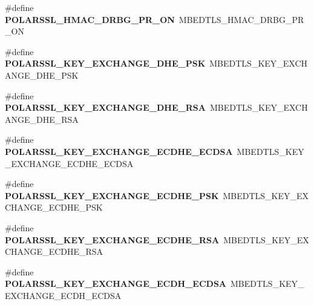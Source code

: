 \begin{DoxyCompactItemize}
\#define {\bfseries P\+O\+L\+A\+R\+S\+S\+L\+\_\+\+H\+M\+A\+C\+\_\+\+D\+R\+B\+G\+\_\+\+P\+R\+\_\+\+ON}~M\+B\+E\+D\+T\+L\+S\+\_\+\+H\+M\+A\+C\+\_\+\+D\+R\+B\+G\+\_\+\+P\+R\+\_\+\+ON
\item 
\mbox{\label{compat-1_83_8h_ae0a092dafdfbe4797aa47c996d6568c8}} 
\#define {\bfseries P\+O\+L\+A\+R\+S\+S\+L\+\_\+\+K\+E\+Y\+\_\+\+E\+X\+C\+H\+A\+N\+G\+E\+\_\+\+D\+H\+E\+\_\+\+P\+SK}~M\+B\+E\+D\+T\+L\+S\+\_\+\+K\+E\+Y\+\_\+\+E\+X\+C\+H\+A\+N\+G\+E\+\_\+\+D\+H\+E\+\_\+\+P\+SK
\item 
\mbox{\label{compat-1_83_8h_a7fded867682fdc0a81c3da4ddcb1bcfd}} 
\#define {\bfseries P\+O\+L\+A\+R\+S\+S\+L\+\_\+\+K\+E\+Y\+\_\+\+E\+X\+C\+H\+A\+N\+G\+E\+\_\+\+D\+H\+E\+\_\+\+R\+SA}~M\+B\+E\+D\+T\+L\+S\+\_\+\+K\+E\+Y\+\_\+\+E\+X\+C\+H\+A\+N\+G\+E\+\_\+\+D\+H\+E\+\_\+\+R\+SA
\item 
\mbox{\label{compat-1_83_8h_a514845d6680be74831a017767a637249}} 
\#define {\bfseries P\+O\+L\+A\+R\+S\+S\+L\+\_\+\+K\+E\+Y\+\_\+\+E\+X\+C\+H\+A\+N\+G\+E\+\_\+\+E\+C\+D\+H\+E\+\_\+\+E\+C\+D\+SA}~M\+B\+E\+D\+T\+L\+S\+\_\+\+K\+E\+Y\+\_\+\+E\+X\+C\+H\+A\+N\+G\+E\+\_\+\+E\+C\+D\+H\+E\+\_\+\+E\+C\+D\+SA
\item 
\mbox{\label{compat-1_83_8h_adb61397794ca4fd9fc820c47228a2f75}} 
\#define {\bfseries P\+O\+L\+A\+R\+S\+S\+L\+\_\+\+K\+E\+Y\+\_\+\+E\+X\+C\+H\+A\+N\+G\+E\+\_\+\+E\+C\+D\+H\+E\+\_\+\+P\+SK}~M\+B\+E\+D\+T\+L\+S\+\_\+\+K\+E\+Y\+\_\+\+E\+X\+C\+H\+A\+N\+G\+E\+\_\+\+E\+C\+D\+H\+E\+\_\+\+P\+SK
\item 
\mbox{\label{compat-1_83_8h_a43e471e2c1ba8d696df9d599033c0bea}} 
\#define {\bfseries P\+O\+L\+A\+R\+S\+S\+L\+\_\+\+K\+E\+Y\+\_\+\+E\+X\+C\+H\+A\+N\+G\+E\+\_\+\+E\+C\+D\+H\+E\+\_\+\+R\+SA}~M\+B\+E\+D\+T\+L\+S\+\_\+\+K\+E\+Y\+\_\+\+E\+X\+C\+H\+A\+N\+G\+E\+\_\+\+E\+C\+D\+H\+E\+\_\+\+R\+SA
\item 
\mbox{\label{compat-1_83_8h_a52dee1a17f8d68917178f5679b2e0fa8}} 
\#define {\bfseries P\+O\+L\+A\+R\+S\+S\+L\+\_\+\+K\+E\+Y\+\_\+\+E\+X\+C\+H\+A\+N\+G\+E\+\_\+\+E\+C\+D\+H\+\_\+\+E\+C\+D\+SA}~M\+B\+E\+D\+T\+L\+S\+\_\+\+K\+E\+Y\+\_\+\+E\+X\+C\+H\+A\+N\+G\+E\+\_\+\+E\+C\+D\+H\+\_\+\+E\+C\+D\+SA
\item 
\mbox{\label{compat-1_83_8h_ab1b936636468e98f54d2c4263be896c6}} 

\end{DoxyCompactItemize}
